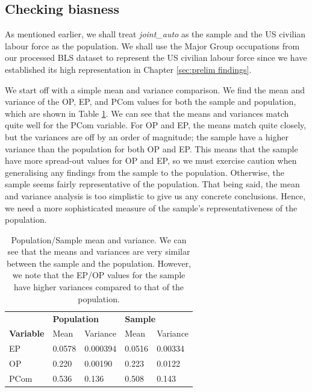 \documentclass[11pt]{article}
\begin{document}
\subsection{Checking biasness}
\label{subsec:Checking biasness}
As mentioned earlier, we shall treat \emph{joint\_auto} as the sample and the US civilian labour force as the population. We shall use the Major Group occupations from our processed BLS dataset to represent the US civilian labour force since we have established its high representation in Chapter \ref{sec:prelim findings}.

We start off with a simple mean and variance comparison.  We find the mean and variance of the OP, EP, and PCom values for both the sample and population, which are shown in Table \ref{tab:mean and variance}. We can see that the means and variances match quite well for the PCom variable. For OP and EP, the means match quite closely, but the variances are off by an order of magnitude; the sample have a higher variance than the population for both OP and EP. This means that the sample have more spread-out values for OP and EP, so we must exercise caution when generalising any findings from the sample to the population. Otherwise, the sample seems fairly representative of the population. That being said, the mean and variance analysis is too simplistic to give us any concrete conclusions. Hence, we need a more sophisticated measure of the sample's representativeness of the population.

\begin{table}[]
	\centering
	\begin{tabular}{l|ll|ll}
					  & \multicolumn{2}{l|}{\textbf{Population}} & \multicolumn{2}{l}{\textbf{Sample}} \\ \cline{2-5} 
	\textbf{Variable} & Mean               & Variance            & Mean            & Variance          \\ \hline
	EP                & 0.0578             & 0.000394            & 0.0516          & 0.00334           \\ \hline
	OP                & 0.220              & 0.00190             & 0.223           & 0.0122            \\ \hline
	PCom              & 0.536              & 0.136               & 0.508           & 0.143            
	\end{tabular}
	\caption{Population/Sample mean and variance. We can see that the means and variances are very similar between the sample and the population. However, we note that the EP/OP values for the sample have higher variances compared to that of the population.}
	\label{tab:mean and variance}
\end{table}
\end{document}
